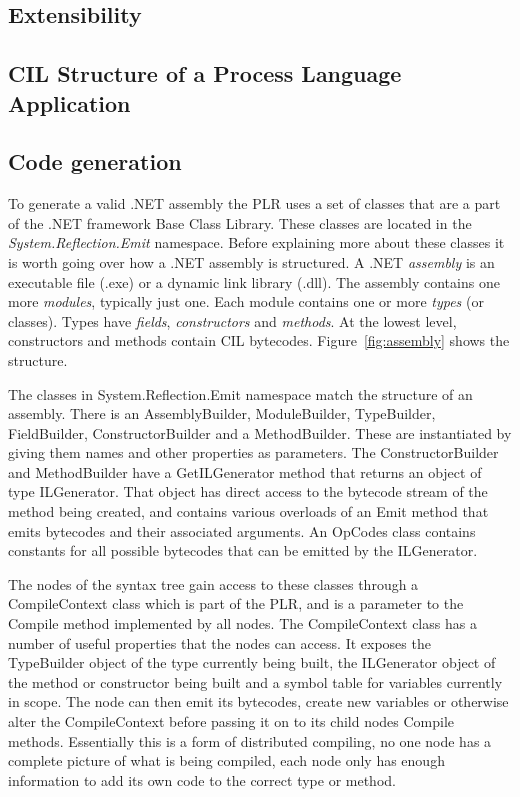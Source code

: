 \subsection{Extensibility}

\subsection{CIL Structure of a Process Language Application}\label{cil_structure}


\subsection{Code generation}
	
	To generate a valid .NET assembly the PLR uses a set of classes that are a 
	part of the .NET framework Base Class Library. These classes are located in 
	the \textit{System.Reflection.Emit} namespace. Before explaining more about 
	these classes it is worth going over how a .NET assembly is structured. A 
	.NET \textit{assembly} is an executable file (.exe) or a dynamic link 
	library (.dll). The assembly contains one more \textit{modules}, typically 
	just one. Each module contains one or more \textit{types} (or classes). 
	Types have \textit{fields}, \textit{constructors} and \textit{methods}. At 
	the lowest level, constructors and methods contain CIL bytecodes. 
	Figure~\ref{fig:assembly} shows the structure.
	
	
	The classes in System.Reflection.Emit namespace match the structure of an 
	assembly. There is an \textsf{AssemblyBuilder}, \textsf{ModuleBuilder}, 
	\textsf{TypeBuilder}, \textsf{FieldBuilder}, \textsf{ConstructorBuilder} and 
	a \textsf{MethodBuilder}. These are instantiated by giving them names and 
	other properties as parameters. The \textsf{ConstructorBuilder} and 
	\textsf{MethodBuilder} have a \textsf{GetILGenerator} method that returns an 
	object of type \textsf{ILGenerator}. That object has direct access to the 
	bytecode stream of the method being created, and contains various overloads 
	of an \textsf{Emit} method that emits bytecodes and their associated 
	arguments. An \textsf{OpCodes} class contains constants for all possible 
	bytecodes that can be emitted by the \textsf{ILGenerator}.
	
	The nodes of the syntax tree gain access to these classes through a 
	\textsf{CompileContext} class which is part of the PLR, and is a parameter 
	to the \textsf{Compile} method implemented by all nodes. The 
	\textsf{CompileContext} class has a number of useful properties that the 
	nodes can access. It exposes the \textsf{TypeBuilder} object of the type 
	currently being built, the \textsf{ILGenerator} object of the method or 
	constructor being built and a symbol table for variables currently in scope. 
	The node can then emit its bytecodes, create new variables or otherwise 
	alter the \textsf{CompileContext} before passing it on to its child nodes 
	\textsf{Compile} methods. Essentially this is a form of distributed 
	compiling, no one node has a complete picture of what is being compiled, 
	each node only has enough information to add its own code to the correct 
	type or method.

